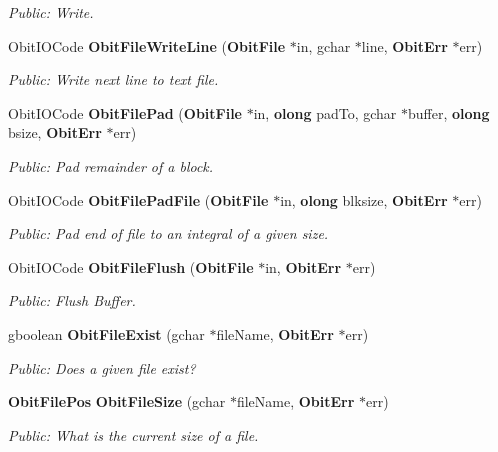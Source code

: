 \begin{CompactItemize}
\begin{CompactList}\small\item\em Public: Write. \item\end{CompactList}\item 
Obit\-IOCode {\bf Obit\-File\-Write\-Line} ({\bf Obit\-File} $\ast$in, gchar $\ast$line, {\bf Obit\-Err} $\ast$err)
\begin{CompactList}\small\item\em Public: Write next line to text file. \item\end{CompactList}\item 
Obit\-IOCode {\bf Obit\-File\-Pad} ({\bf Obit\-File} $\ast$in, {\bf olong} pad\-To, gchar $\ast$buffer, {\bf olong} bsize, {\bf Obit\-Err} $\ast$err)
\begin{CompactList}\small\item\em Public: Pad remainder of a block. \item\end{CompactList}\item 
Obit\-IOCode {\bf Obit\-File\-Pad\-File} ({\bf Obit\-File} $\ast$in, {\bf olong} blksize, {\bf Obit\-Err} $\ast$err)
\begin{CompactList}\small\item\em Public: Pad end of file to an integral of a given size. \item\end{CompactList}\item 
Obit\-IOCode {\bf Obit\-File\-Flush} ({\bf Obit\-File} $\ast$in, {\bf Obit\-Err} $\ast$err)
\begin{CompactList}\small\item\em Public: Flush Buffer. \item\end{CompactList}\item 
gboolean {\bf Obit\-File\-Exist} (gchar $\ast$file\-Name, {\bf Obit\-Err} $\ast$err)
\begin{CompactList}\small\item\em Public: Does a given file exist? \item\end{CompactList}\item 
{\bf Obit\-File\-Pos} {\bf Obit\-File\-Size} (gchar $\ast$file\-Name, {\bf Obit\-Err} $\ast$err)
\begin{CompactList}\small\item\em Public: What is the current size of a file. \item\end{CompactList}\item 

\end{CompactItemize}
